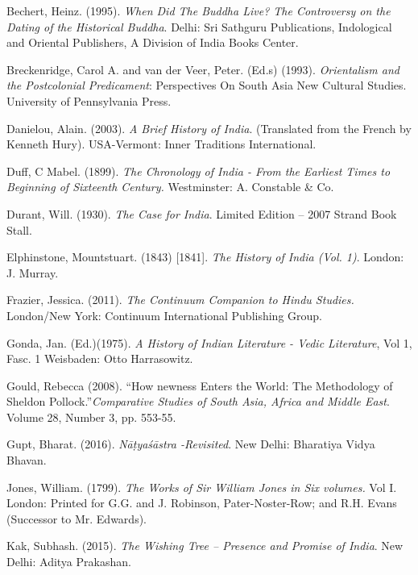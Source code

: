 \begin{thebibliography}{99}
\itemsep=1pt
 Bechert, Heinz. (1995). \textit{When Did The Buddha Live? The Controversy on the Dating of the Historical Buddha}. Delhi: Sri Sathguru Publications, Indological and Oriental Publishers, A Division of India Books Center.

  Breckenridge, Carol A. and van der Veer, Peter. (Ed.s) (1993). \textit{Orientalism and the Postcolonial Predicament}: Perspectives On South Asia New Cultural Studies. University of Pennsylvania Press.

  Danielou, Alain. (2003). \textit{A Brief History of India}. (Translated from the French by Kenneth Hury). USA-Vermont: Inner Traditions International.

  Duff, C Mabel. (1899). \textit{The Chronology of India - From the Earliest Times to Beginning of Sixteenth Century.} Westminster: A. Constable \& Co.

  Durant, Will. (1930). \textit{The Case for India}. Limited Edition – 2007 Strand Book Stall.

  Elphinstone, Mountstuart. (1843) [1841]. \textit{The History of India (Vol. 1)}. London: J. Murray.

  Frazier, Jessica. (2011). \textit{The Continuum Companion to Hindu Studies.} London/New York: Continuum International Publishing Group.

  Gonda, Jan. (Ed.)(1975). \textit{A History of Indian Literature - Vedic Literature}, Vol 1, Fasc. 1 Weisbaden: Otto Harrasowitz.

  Gould, Rebecca (2008). “How newness Enters the World: The Methodology of Sheldon Pollock.”\textit{Comparative Studies of South Asia, Africa and Middle East}. Volume 28, Number 3, pp. 553-55.

  Gupt, Bharat. (2016). \textit{Nāṭyaśāstra -Revisited}. New Delhi: Bharatiya Vidya Bhavan.

  Jones, William. (1799). \textit{ The Works of Sir William Jones in Six volumes.} Vol I. London: Printed for G.G. and J. Robinson, Pater-Noster-Row; and R.H. Evans (Successor to Mr. Edwards).

  Kak, Subhash. (2015). \textit{The Wishing Tree – Presence and Promise of India}. New Delhi: Aditya Prakashan.


\end{thebibliography}
